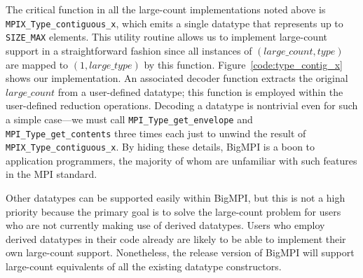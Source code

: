 The critical function in all the large-count implementations noted above
is \texttt{MPIX\_Type\_contiguous\_x}, which emits a single datatype that
represents up to \texttt{SIZE\_MAX} elements.
This utility routine allows us to implement large-count support in a straightforward
fashion since all instances of $(large\_count,type)$ are mapped to $(1,large\_type)$
by this function.  Figure~\ref{code:type_contig_x} shows our implementation.
An associated decoder function extracts the original $large\_count$ from a
user-defined datatype; this function is employed within the user-defined reduction
operations.  Decoding a datatype is nontrivial even for such a simple case---we
must call \texttt{MPI\_Type\_get\_envelope} and \texttt{MPI\_Type\_get\_contents}
three times each just to unwind the result of \texttt{MPIX\_Type\_contiguous\_x}.
By hiding these details,
BigMPI is a boon to application programmers, the majority of whom are unfamiliar 
with such features in the MPI standard.

Other datatypes can be supported easily within BigMPI, but this is not a high
priority because the primary goal is to solve the large-count problem for users
who are not currently making use of derived datatypes.
Users who employ derived datatypes in their code already are likely to be able
to implement their own large-count support. 
Nonetheless, the release version of BigMPI will support large-count equivalents
of all the existing datatype constructors.

